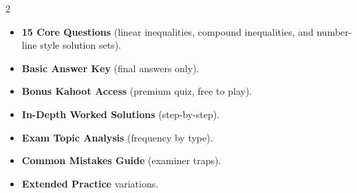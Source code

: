 \documentclass[11pt,a4paper]{article}
\newcommand{\FullReleaseDate}{April 30, 2026}
\begin{document}
\vspace{8pt}

\begin{multicols}{2}
  \begin{tcolorbox}[card, title=\sffamily\bfseries\textcolor{white}{\faHandPointDown\ TODAY (Simplified Version)}, colbacktitle=mainblue, boxed title style={sharp corners, boxrule=0pt}]
    \begin{itemize}[leftmargin=1.2em, itemsep=2pt]
      \item \small \textbf{15 Core Questions} (linear inequalities, compound inequalities, and number-line style solution sets).
      \item \small \textbf{Basic Answer Key} (final answers only).
      \item \small \textbf{Bonus Kahoot Access} (premium quiz, free to play).
    \end{itemize}
  \end{tcolorbox}

  \columnbreak

  \begin{tcolorbox}[card, title=\sffamily\bfseries\textcolor{white}{\faRocket\ ON \FullReleaseDate\ (Full Upgrade)}, colbacktitle=mainblue, boxed title style={sharp corners, boxrule=0pt}]
    \begin{itemize}[leftmargin=1.2em, itemsep=2pt]
      \item \small \textbf{In-Depth Worked Solutions} (step-by-step).
      \item \small \textbf{Exam Topic Analysis} (frequency by type).
      \item \small \textbf{Common Mistakes Guide} (examiner traps).
      \item \small \textbf{Extended Practice} variations.
    \end{itemize}
  \end{tcolorbox}
\end{multicols}
\end{document}

